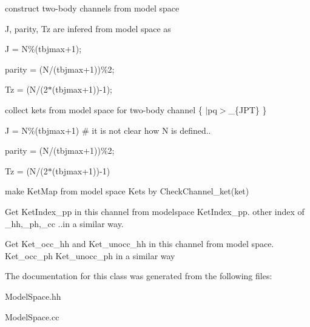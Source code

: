 construct two-\/body channels from model space

J, parity, Tz are infered from model space as

J = N\%(tbjmax+1);

parity = (N/(tbjmax+1))\%2;

Tz = (N/(2$\ast$(tbjmax+1))-\/1);

collect kets from model space for two-\/body channel \{ $\vert$pq$>$\+\_\+\{J\+PT\} \}


\begin{DoxyEnumerate}
\item J = N\%(tbjmax+1) \# it is not clear how N is defined..
\item parity = (N/(tbjmax+1))\%2;
\item Tz = (N/(2$\ast$(tbjmax+1))-\/1)
\item make Ket\+Map from model space Kets by Check\+Channel\+\_\+ket(ket)
\item Get Ket\+Index\+\_\+pp in this channel from modelspace Ket\+Index\+\_\+pp. other index of \+\_\+hh,\+\_\+ph,\+\_\+cc ..in a similar way.
\item Get Ket\+\_\+occ\+\_\+hh and Ket\+\_\+unocc\+\_\+hh in this channel from model space. Ket\+\_\+occ\+\_\+ph Ket\+\_\+unocc\+\_\+ph in a similar way 
\end{DoxyEnumerate}

The documentation for this class was generated from the following files\+:\begin{DoxyCompactItemize}
\item 
Model\+Space.\+hh\item 
Model\+Space.\+cc\end{DoxyCompactItemize}
